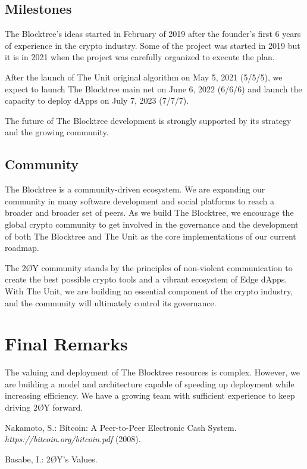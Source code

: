 \documentclass[12pt]{article}
\begin{document}
\subsection{Milestones}

The Blocktree's ideas started in February of 2019 after the founder's first 6 years of experience in the crypto industry. Some of the project was started in 2019 but it is in 2021 when the project was carefully organized to execute the plan.

After the launch of The Unit original algorithm on May 5, 2021 (5/5/5), we expect to launch The Blocktree main net on June 6, 2022 (6/6/6) and launch the capacity to deploy dApps on July 7, 2023 (7/7/7).

The future of The Blocktree development is strongly supported by its strategy and the growing community.


\subsection{Community}

The Blocktree is a community-driven ecosystem. We are expanding our community in many software development and social platforms to reach a broader and broader set of peers. As we build The Blocktree, we encourage the global crypto community to get involved in the governance and the development of both The Blocktree and The Unit as the core implementations of our current roadmap.

The 2ØY community stands by the principles of non-violent communication to create the best possible crypto tools and a vibrant ecosystem of Edge dApps. With The Unit, we are building an essential component of the crypto industry, and the community will ultimately control its governance.

\section{Final Remarks}

The valuing and deployment of The Blocktree resources is complex. However, we are building a model and architecture capable of speeding up deployment while increasing efficiency. We have a growing team with sufficient experience to keep driving 2ØY forward.


\begin{thebibliography}{[BLSWZ9]}


 Nakamoto, S.: Bitcoin: A Peer-to-Peer Electronic Cash System. \emph{https://bitcoin.org/bitcoin.pdf} (2008).


 Basabe, I.: 2ØY's Values.



\end{thebibliography}
\end{document}
